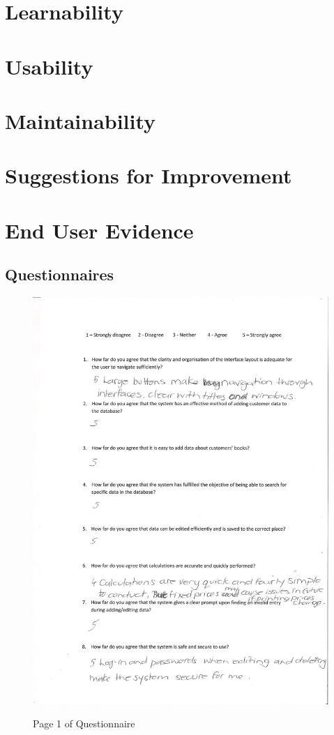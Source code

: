 \section{Learnability}

\section{Usability}

\section{Maintainability}

\section{Suggestions for Improvement}

\section{End User Evidence}

\subsection{Questionnaires} 

\begin{figure}[H]
    \includegraphics[width=\textwidth]{./Evaluation/Questionnaire1.png}
    \label{fig:QuestionnairePage1} \caption{Page 1 of Questionnaire}
\end{figure}

